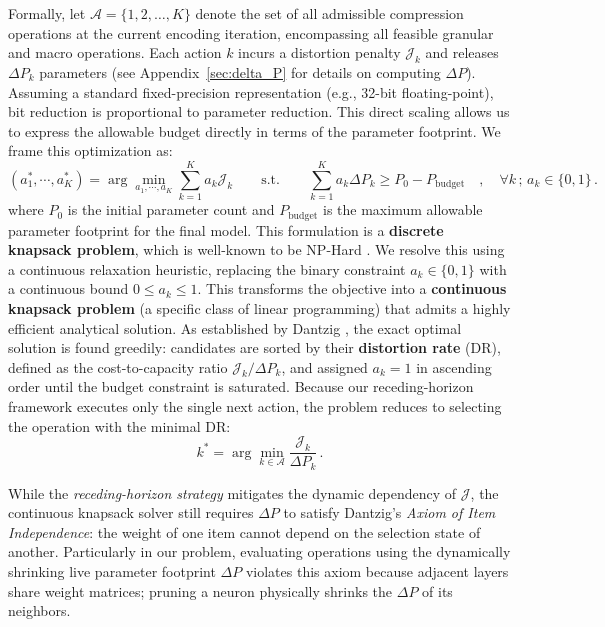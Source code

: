 \documentclass[11pt, a4paper, copyright, gdm]{google}
\newcommand{\calA}{\mathcal{A}}
\newcommand{\calJ}{\mathcal{J}}
\theoremstyle{definition}
\begin{document}
Formally, let $\calA = \{1, 2, \dots, K\}$ denote the set of all admissible compression operations at the current encoding iteration, encompassing all feasible granular and macro operations. Each action $k$ incurs a distortion penalty $\calJ_k$ and releases $\Delta P_k$ parameters (see Appendix~\ref{sec:delta_P} for details on computing $\Delta P$). Assuming a standard fixed-precision representation (e.g., 32-bit floating-point), bit reduction is proportional to parameter reduction. This direct scaling allows us to express the allowable budget directly in terms of the parameter footprint. We frame this optimization as:
\begin{equation}
(a_1^*,\cdots,a_K^*) = \arg\min_{a_1,\cdots,a_K} \sum_{k=1}^K a_k \calJ_k \qquad\mbox{s.t.}\qquad \sum_{k=1}^K a_k \Delta P_k \geq P_0 - P_{\text{budget}} \quad,\quad \forall k \,;\, a_k \in \{0,1\} \,.
\end{equation}
where $P_0$ is the initial parameter count and $P_{\text{budget}}$ is the maximum allowable parameter footprint for the final model. This formulation is a \textbf{discrete knapsack problem}, which is well-known to be NP-Hard \cite{karp1972reducibility, garey1979computers}. We resolve this using a continuous relaxation heuristic, replacing the binary constraint $a_k \in \{0,1\}$ with a continuous bound $0 \leq a_k \leq 1$. This transforms the objective into a \textbf{continuous knapsack problem} (a specific class of linear programming) that admits a highly efficient analytical solution. As established by Dantzig \cite{dantzig1957discrete}, the exact optimal solution is found greedily: candidates are sorted by their \textbf{distortion rate} (DR), defined as the cost-to-capacity ratio $\calJ_k / \Delta P_k$, and assigned $a_k = 1$ in ascending order until the budget constraint is saturated. Because our receding-horizon framework executes only the single next action, the problem reduces to selecting the operation with the minimal DR: 
\begin{equation}
k^* = \arg\min_{k \in \calA} \frac{\calJ_k}{\Delta P_k} \,.
\end{equation}

While the \textit{receding-horizon strategy} mitigates the dynamic dependency of $\calJ$, the continuous knapsack solver still requires $\Delta P$ to satisfy Dantzig's \textit{Axiom of Item Independence}: the weight of one item cannot depend on the selection state of another. Particularly in our problem, evaluating operations using the dynamically shrinking live parameter footprint $\Delta P$ violates this axiom because adjacent layers share weight matrices; pruning a neuron physically shrinks the $\Delta P$ of its neighbors.
\end{document}
